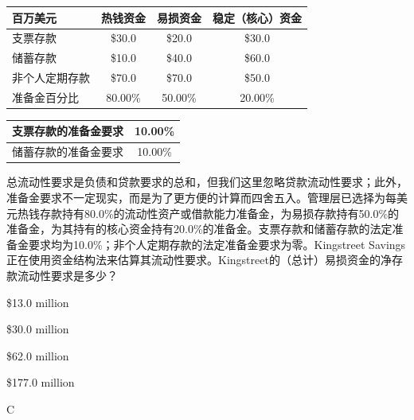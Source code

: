 \documentclass{article}
\newcounter{question} %
\begin{document}
\begin{question}
    \begin{table}[htbp]
        \centering
        \begin{tabular}{|l|c|c|c|}
            \hline
            \textbf{百万美元} & \textbf{热钱资金} & \textbf{易损资金} & \textbf{稳定（核心）资金} \\
            \hline
            支票存款         & \$30.0 & \$20.0 & \$30.0 \\
            储蓄存款           & \$10.0 & \$40.0 & \$60.0 \\
            非个人定期存款  & \$70.0 & \$70.0 & \$50.0 \\
            \hline
            准备金百分比        & 80.00\% & 50.00\% & 20.00\% \\
            \hline
        \end{tabular}
    \end{table}

    \begin{table}[H]
        \centering
        \begin{tabular}{|l|c|}
            \hline
            支票存款的准备金要求 & 10.00\% \\
            \hline
            储蓄存款的准备金要求   & 10.00\% \\
            \hline
        \end{tabular}
    \end{table}

    总流动性要求是负债和贷款要求的总和，但我们这里忽略贷款流动性要求；此外，准备金要求不一定现实，而是为了更方便的计算而四舍五入。管理层已选择为每美元热钱存款持有80.0\%的流动性资产或借款能力准备金，为易损存款持有50.0\%的准备金，为其持有的核心资金持有20.0\%的准备金。支票存款和储蓄存款的法定准备金要求均为10.0\%；非个人定期存款的法定准备金要求为零。Kingstreet Savings正在使用资金结构法来估算其流动性要求。Kingstreet的（总计）易损资金的净存款流动性要求是多少？
\end{question}

\begin{choices}
    \item \$13.0 million
    \item \$30.0 million
    \item \$62.0 million
    \item \$177.0 million
\end{choices}

\begin{correctanswer}
    C
\end{correctanswer}
\end{document}

